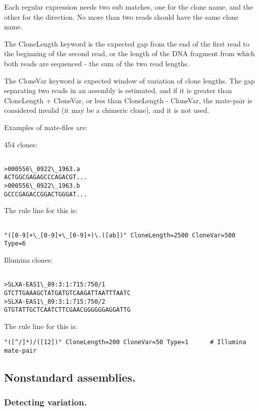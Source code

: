 \documentclass{article}[12pt]
\begin{document}
  Each regular expression needs two sub matches, one for the clone
  name, and the other for the direction.  No more than two reads
  should have the same clone name.
	
  The CloneLength keyword is the expected gap from the end of the
  first read to the beginning of the second read, or the length of the
  DNA fragment from which both reads are sequenced - the sum of the
  two read lengths.

	The CloneVar keyword is expected window of variation of clone
	lengths.  The gap separating two reads in an assembly is estimated,
	and if it is greater than CloneLength + CloneVar, or less than
	CloneLength - CloneVar, the mate-pair is considered invalid (it may
	be a chimeric clone), and it is not used.

  

 Examples of mate-files are:


454 clones:
\begin{verbatim}
	
>000556\_0922\_1963.a
ACTGGCGAGAGCCCAGACGT...
>000556\_0922\_1963.b
GCCCGAGACCGGACTGGGAT...
\end{verbatim}

The rule line for this is:
\begin{verbatim}

"([0-9]+\_[0-9]+\_[0-9]+)\.([ab])" CloneLength=2500 CloneVar=500 Type=6
\end{verbatim}

Illumina clones:
\begin{verbatim}

>SLXA-EAS1\_89:3:1:715:750/1
GTCTTGAAAGCTATGATGTCAAGATTAATTTAATC
>SLXA-EAS1\_89:3:1:715:750/2
GTGTATTGCTCAATCTTCGAACGGGGGGAGGATTG
\end{verbatim}

The rule line for this is:
\begin{verbatim}
"([^/]*)/([12])" CloneLength=200 CloneVar=50 Type=1      # Illumina mate-pair
\end{verbatim}


	\subsection{Nonstandard assemblies.}
	
	\subsubsection{Detecting variation.}
\end{document}

